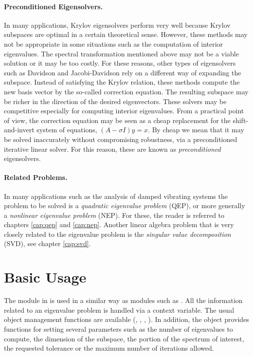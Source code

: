 \paragraph{Preconditioned Eigensolvers.}
	In many applications, Krylov eigensolvers perform very well because Krylov subspaces are optimal in a certain theoretical sense. However, these methods may not be appropriate in some situations such as the computation of interior eigenvalues. The spectral transformation mentioned above may not be a viable solution or it may be too costly. For these reasons, other types of eigensolvers such as Davidson and Jacobi-Davidson rely on a different way of expanding the subspace. Instead of satisfying the Krylov relation, these methods compute the new basis vector by the so-called correction equation. The resulting subspace may be richer in the direction of the desired eigenvectors. These solvers may be competitive especially for computing interior eigenvalues. From a practical point of view, the correction equation may be seen as a cheap replacement for the shift-and-invert system of equations, $(A-\sigma I)y=x$. By cheap we mean that it may be solved inaccurately without compromising robustness, via a preconditioned iterative linear solver. For this reason, these are known as \emph{preconditioned} eigensolvers.

\paragraph{Related Problems.}

	In many applications such as the analysis of damped vibrating systems the problem to be solved is a \emph{quadratic eigenvalue problem} (QEP), or more generally a \emph{nonlinear eigenvalue problem} (NEP). For these, the reader is referred to chapters \ref{cap:qep} and \ref{cap:nep}. Another linear algebra problem that is very closely related to the eigenvalue problem is the {\em singular value decomposition\/} (SVD), see chapter \ref{cap:svd}. 

\section{Basic Usage}

	The  module in \slepc is used in a similar way as \petsc modules such as . All the information related to an eigenvalue problem is handled via a context variable. The usual object management functions are available (, , , ). In addition, the  object provides functions for setting several parameters such as the number of eigenvalues to compute, the dimension of the subspace, the portion of the spectrum of interest, the requested tolerance or the maximum number of iterations allowed.

